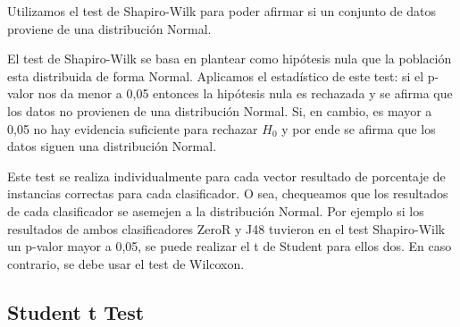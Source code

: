 

Utilizamos el test de Shapiro-Wilk para poder afirmar si un conjunto de datos proviene de una distribución Normal.


El test de Shapiro-Wilk se basa en plantear como hipótesis nula que la población esta distribuida de forma Normal. Aplicamos el estadístico de este test: si el p-valor nos da menor a 0,05 entonces la hipótesis nula es rechazada y se afirma que los datos no provienen de una distribución Normal. Si, en cambio, es mayor a 0,05 no hay evidencia suficiente para rechazar $H_0$ y por ende se afirma que los datos siguen una distribución Normal.

Este test se realiza individualmente para cada vector resultado de porcentaje de instancias correctas para cada clasificador. O sea, chequeamos que los resultados de cada clasificador se asemejen a la distribución Normal. Por ejemplo si los resultados de ambos clasificadores ZeroR y J48 tuvieron en el test Shapiro-Wilk un p-valor mayor a 0,05, se puede realizar el t de Student para ellos dos. En caso contrario, se debe usar el test de Wilcoxon.

\subsection{Student t Test}


